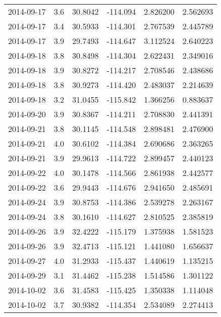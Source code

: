 \begin{tabular}{lrrrrr}
2014-09-17 &       3.6 &  30.8042 &  -114.094 &         2.826200 &         2.562693 \\
2014-09-17 &       3.4 &  30.5933 &  -114.301 &         2.767539 &         2.445789 \\
2014-09-17 &       3.9 &  29.7493 &  -114.647 &         3.112524 &         2.640223 \\
2014-09-18 &       3.8 &  30.8498 &  -114.304 &         2.622431 &         2.349016 \\
2014-09-18 &       3.9 &  30.8272 &  -114.217 &         2.708546 &         2.438686 \\
2014-09-18 &       3.8 &  30.9273 &  -114.420 &         2.483037 &         2.214639 \\
2014-09-18 &       3.2 &  31.0455 &  -115.842 &         1.366256 &         0.883637 \\
2014-09-20 &       3.9 &  30.8367 &  -114.211 &         2.708830 &         2.441391 \\
2014-09-21 &       3.8 &  30.1145 &  -114.548 &         2.898481 &         2.476900 \\
2014-09-21 &       4.0 &  30.6102 &  -114.384 &         2.690686 &         2.363265 \\
2014-09-21 &       3.9 &  29.9613 &  -114.722 &         2.899457 &         2.440123 \\
2014-09-22 &       4.0 &  30.1478 &  -114.566 &         2.861938 &         2.442577 \\
2014-09-22 &       3.6 &  29.9443 &  -114.676 &         2.941650 &         2.485691 \\
2014-09-24 &       3.9 &  30.8753 &  -114.386 &         2.539278 &         2.263167 \\
2014-09-24 &       3.8 &  30.1610 &  -114.627 &         2.810525 &         2.385819 \\
2014-09-26 &       3.9 &  32.4222 &  -115.179 &         1.375938 &         1.581523 \\
2014-09-26 &       3.9 &  32.4713 &  -115.121 &         1.441080 &         1.656637 \\
2014-09-27 &       4.0 &  31.2933 &  -115.437 &         1.440619 &         1.135215 \\
2014-09-29 &       3.1 &  31.4462 &  -115.238 &         1.514586 &         1.301122 \\
2014-10-02 &       3.6 &  31.4583 &  -115.425 &         1.350338 &         1.114048 \\
2014-10-02 &       3.7 &  30.9382 &  -114.354 &         2.534089 &         2.274413 \\

\end{tabular}
